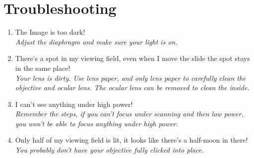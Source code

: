 \section{Troubleshooting}

\begin{enumerate}

\item{The Image is too dark!\\
\textit{Adjust the diaphragm and make sure your light is on.}}

\item{There's a spot in my viewing field, even when I move the slide the spot stays in the same place!\\
\textit{Your lens is dirty. Use lens paper, and only lens paper to carefully clean the objective and ocular lens. The ocular lens can be removed to clean the inside.}}

\item{I can't see anything under high power!\\
\textit{Remember the steps, if you can't focus under scanning and then low power, you won't be able to focus anything under high power.}}

\item{Only half of my viewing field is lit, it looks like there's a half-moon in there!\\
\textit{You probably don't have your objective fully clicked into place.}}

\end{enumerate}
